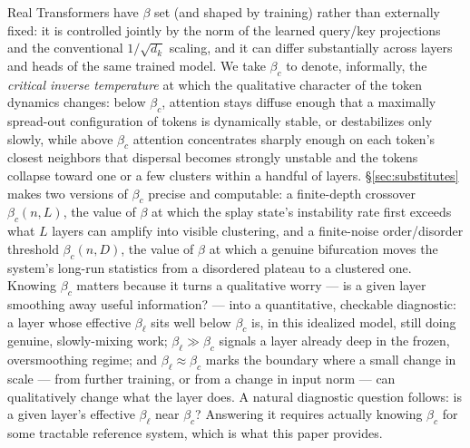 \documentclass[11pt]{article}
\begin{document}
Real Transformers have $\beta$ set (and shaped by training) rather than externally fixed: it is controlled jointly by the norm of the learned query/key projections and the conventional $1/\sqrt{d_k}$ scaling, and it can differ substantially across layers and heads of the same trained model. We take $\beta_c$ to denote, informally, the \emph{critical inverse temperature} at which the qualitative character of the token dynamics changes: below $\beta_c$, attention stays diffuse enough that a maximally spread-out configuration of tokens is dynamically stable, or destabilizes only slowly, while above $\beta_c$ attention concentrates sharply enough on each token's closest neighbors that dispersal becomes strongly unstable and the tokens collapse toward one or a few clusters within a handful of layers. \S\ref{sec:substitutes} makes two versions of $\beta_c$ precise and computable: a finite-depth crossover $\beta_c(n,L)$, the value of $\beta$ at which the splay state's instability rate first exceeds what $L$ layers can amplify into visible clustering, and a finite-noise order/disorder threshold $\beta_c(n,D)$, the value of $\beta$ at which a genuine bifurcation moves the system's long-run statistics from a disordered plateau to a clustered one. Knowing $\beta_c$ matters because it turns a qualitative worry --- is a given layer smoothing away useful information? --- into a quantitative, checkable diagnostic: a layer whose effective $\beta_\ell$ sits well below $\beta_c$ is, in this idealized model, still doing genuine, slowly-mixing work; $\beta_\ell\gg\beta_c$ signals a layer already deep in the frozen, oversmoothing regime; and $\beta_\ell\approx\beta_c$ marks the boundary where a small change in scale --- from further training, or from a change in input norm --- can qualitatively change what the layer does. A natural diagnostic question follows: is a given layer's effective $\beta_\ell$ near $\beta_c$? Answering it requires actually knowing $\beta_c$ for some tractable reference system, which is what this paper provides.
\end{document}
